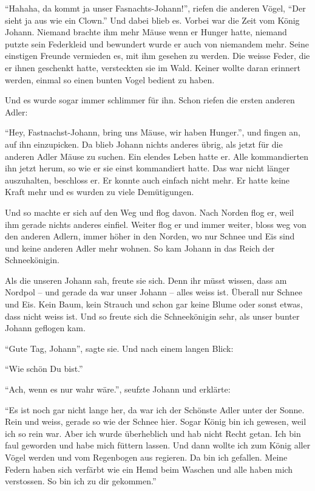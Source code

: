 \enquote{Hahaha, da kommt ja unser Fasnachts-Johann!}, riefen die anderen
Vögel, \enquote{Der sieht ja aus wie ein Clown.} Und dabei blieb es. Vorbei war
die Zeit vom König Johann. Niemand brachte ihm mehr Mäuse wenn er Hunger hatte,
niemand putzte sein Federkleid und bewundert wurde er auch von niemandem mehr.
Seine einstigen Freunde vermieden es, mit ihm gesehen zu werden. Die weisse
Feder, die er ihnen geschenkt hatte, versteckten sie im Wald. Keiner wollte
daran erinnert werden, einmal so einen bunten Vogel bedient zu haben. 

Und es wurde sogar immer schlimmer für ihn. Schon riefen die ersten anderen Adler:

\enquote{Hey, Fastnachst-Johann, bring uns Mäuse, wir haben Hunger.}, und fingen an, auf ihn einzupicken. Da blieb Johann nichts anderes übrig, als jetzt für die anderen Adler Mäuse zu suchen. Ein elendes Leben hatte er. Alle kommandierten ihn jetzt herum, so wie er sie einst kommandiert hatte. Das war nicht länger auszuhalten, beschloss er. Er konnte auch einfach nicht mehr. Er hatte keine Kraft mehr und es wurden zu viele Demütigungen.

Und so machte er sich auf den Weg und flog davon. Nach Norden flog er, weil ihm gerade nichts anderes einfiel. Weiter flog er und immer weiter, bloss weg von den anderen Adlern, immer höher in den Norden, wo nur Schnee und Eis sind und keine anderen Adler mehr wohnen. So kam Johann in das Reich der Schneekönigin.

Als die unseren Johann sah, freute sie sich. Denn ihr müsst wissen, dass am Nordpol -- und gerade da war unser Johann -- alles weiss ist. Überall nur Schnee und Eis. Kein Baum, kein Strauch und schon gar keine Blume oder sonst etwas, dass nicht weiss ist. Und so freute sich die Schneekönigin sehr, als unser bunter Johann geflogen kam. 

\enquote{Gute Tag, Johann}, sagte sie. Und nach einem langen Blick: 

\enquote{Wie schön Du bist.} 

\enquote{Ach, wenn es nur wahr wäre.}, seufzte Johann und erklärte: 

\enquote{Es ist noch gar nicht lange her, da war ich der Schönste Adler unter
der Sonne. Rein und weiss, gerade so wie der Schnee hier. Sogar König bin ich gewesen, weil ich so rein war. Aber ich wurde überheblich und hab nicht Recht getan. Ich bin faul geworden und habe mich füttern lassen. Und dann wollte ich zum König aller Vögel werden und vom Regenbogen aus regieren. Da bin ich gefallen. Meine Federn haben sich verfärbt wie ein Hemd beim Waschen und alle haben mich verstossen. So bin ich zu dir gekommen.}

